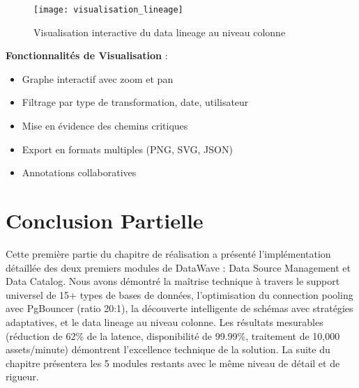 \begin{figure}[htpb]
\centering
\texttt{[image: visualisation\_lineage]}
\caption{Visualisation interactive du data lineage au niveau colonne}
\label{fig:visualisation_lineage}
\end{figure}

\textbf{Fonctionnalités de Visualisation} :
\begin{itemize}
    \item Graphe interactif avec zoom et pan
    \item Filtrage par type de transformation, date, utilisateur
    \item Mise en évidence des chemins critiques
    \item Export en formats multiples (PNG, SVG, JSON)
    \item Annotations collaboratives
\end{itemize}

\section*{Conclusion Partielle}

Cette première partie du chapitre de réalisation a présenté l'implémentation détaillée des deux premiers modules de DataWave : Data Source Management et Data Catalog. Nous avons démontré la maîtrise technique à travers le support universel de 15+ types de bases de données, l'optimisation du connection pooling avec PgBouncer (ratio 20:1), la découverte intelligente de schémas avec stratégies adaptatives, et le data lineage au niveau colonne. Les résultats mesurables (réduction de 62\% de la latence, disponibilité de 99.99\%, traitement de 10,000 assets/minute) démontrent l'excellence technique de la solution. La suite du chapitre présentera les 5 modules restants avec le même niveau de détail et de rigueur.
